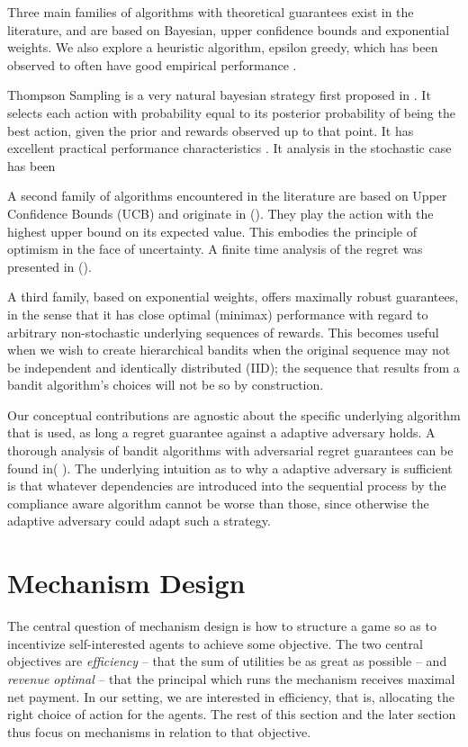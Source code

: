 Three main families of algorithms with theoretical guarantees exist in the literature, and are based on Bayesian, upper confidence bounds and exponential weights. We also explore a  heuristic algorithm, epsilon greedy, which has been observed to often have good empirical performance \cite{kuleshov:14}.

Thompson Sampling is a very natural bayesian strategy first proposed in \cite{thompson:33}. It selects each action with probability equal to its posterior probability of being the best action, given the prior and rewards observed up to that point. It has excellent practical performance characteristics \cite{chapelle2011empirical}. It analysis in the stochastic case has been 

A second family of algorithms encountered in the literature are based on Upper Confidence Bounds (UCB) and originate in (\cite{lai:85,katehakis1995sequential,agrawal1995sample}). They play the action with the highest upper bound on its expected value. This embodies the principle of optimism in the face of uncertainty. A finite time analysis of the regret was presented in (\cite{auer:02a}).

A third family, based on exponential weights, offers maximally robust guarantees, in the sense that it has close optimal (minimax) performance with regard to arbitrary non-stochastic underlying sequences of rewards. This becomes useful when we wish to create hierarchical bandits when the original sequence may not be independent and identically distributed (IID); the sequence that results from a bandit algorithm's choices will not be so by construction.

 Our conceptual contributions are agnostic about the specific underlying algorithm that is used, as long a regret guarantee against a adaptive adversary holds. A thorough analysis of bandit algorithms with adversarial regret guarantees can be found in( \cite{bubeck:12, banditalgo2016}). The underlying intuition as to why a adaptive adversary is sufficient is that whatever dependencies are introduced into the sequential process by the compliance aware algorithm cannot be worse than those, since otherwise the adaptive adversary could adapt such a strategy.
 


\section{Mechanism Design}

The central question of mechanism design is how to structure a game so as to incentivize self-interested agents to achieve some objective.
The two central objectives are \emph{efficiency} -- that the sum of utilities be as great as possible -- and \emph{revenue optimal} -- that the principal which runs the mechanism receives maximal net payment.
In our setting, we are interested in efficiency, that is, allocating the right choice of action for the agents. The rest of this section and the later section thus focus on mechanisms in relation to that objective.

